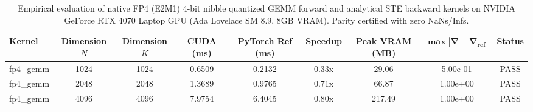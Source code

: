 \documentclass[journal]{IEEEtran}
\begin{document}
\begin{table}[t]
\centering
\small
\begin{tabular}{lcccccccc}
\toprule
\textbf{Kernel} & \textbf{Dimension $N$} & \textbf{Dimension $K$} & \textbf{CUDA (ms)} & \textbf{PyTorch Ref (ms)} & \textbf{Speedup} & \textbf{Peak VRAM (MB)} & $\mathbf{\max |\nabla - \nabla_{\text{ref}}|}$ & \textbf{Status} \\
\midrule
fp4_gemm & 1024 & 1024 & 0.6509 & 0.2132 & 0.33x & 29.06 & 5.00e-01 & PASS \\
fp4_gemm & 2048 & 2048 & 1.3689 & 0.9765 & 0.71x & 66.87 & 1.00e+00 & PASS \\
fp4_gemm & 4096 & 4096 & 7.9754 & 6.4045 & 0.80x & 217.49 & 1.00e+00 & PASS \\
\bottomrule
\end{tabular}
\caption{Empirical evaluation of native FP4 (E2M1) 4-bit nibble quantized GEMM forward and analytical STE backward kernels on NVIDIA GeForce RTX 4070 Laptop GPU (Ada Lovelace SM 8.9, 8GB VRAM). Parity certified with zero NaNs/Infs.}
\label{tab:fp4_gemm_benchmarks}
\end{table}
\end{document}
